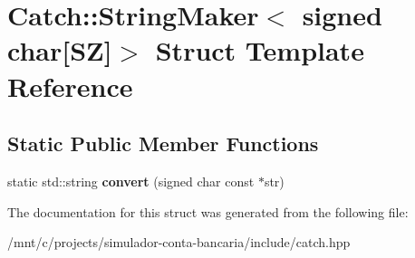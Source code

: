 \hypertarget{structCatch_1_1StringMaker_3_01signed_01char[SZ]_4}{}\section{Catch\+:\+:String\+Maker$<$ signed char\mbox{[}SZ\mbox{]}$>$ Struct Template Reference}
\label{structCatch_1_1StringMaker_3_01signed_01char[SZ]_4}
\subsection*{Static Public Member Functions}
\begin{DoxyCompactItemize}
\item 
\mbox{\label{structCatch_1_1StringMaker_3_01signed_01char[SZ]_4_a23ac689cc79dbcfe9b1765fe9e25690e}} 
static std\+::string {\bfseries convert} (signed char const $\ast$str)
\end{DoxyCompactItemize}


The documentation for this struct was generated from the following file\+:\begin{DoxyCompactItemize}
\item 
/mnt/c/projects/simulador-\/conta-\/bancaria/include/catch.\+hpp\end{DoxyCompactItemize}
